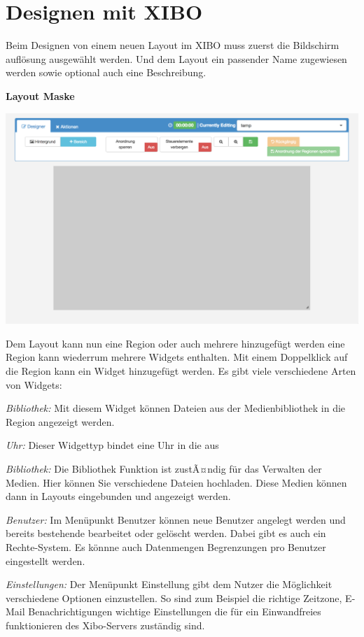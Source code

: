 \section{Designen mit XIBO}\label{sec:designexibo}
Beim Designen von einem neuen Layout im XIBO muss zuerst die Bildschirm auflösung ausgewählt werden. Und dem Layout ein passender Name zugewiesen werden sowie optional auch eine Beschreibung. 

\textbf{Layout Maske}

\begin{calendar}
	\centering
\includegraphics[width=1\textwidth]{images/xibo-basics-designer}
	\label{Calendar}
\end{calendar}	

Dem Layout kann nun eine Region oder auch mehrere  hinzugefügt werden eine Region kann wiederrum mehrere Widgets enthalten. Mit einem Doppelklick auf die Region kann ein Widget hinzugefügt werden. Es gibt viele verschiedene Arten von Widgets:

\begin{widgettypes}
	\item {\em Bibliothek:} Mit diesem Widget können Dateien aus der Medienbibliothek in die Region angezeigt werden. 

	
	\item {\em Uhr:} 
	Dieser Widgettyp bindet eine Uhr in die aus
	
	\item {\em Bibliothek:} 
	Die Bibliothek Funktion ist zustÃ¤ndig für das Verwalten der Medien. Hier können Sie verschiedene Dateien hochladen.  Diese Medien können dann in Layouts eingebunden und angezeigt werden.
	
	\item {\em Benutzer:} 
	Im Menüpunkt Benutzer können neue Benutzer angelegt werden und bereits bestehende bearbeitet oder gelöscht werden. Dabei gibt es auch ein Rechte-System. Es könnne auch Datenmengen Begrenzungen pro Benutzer eingestellt werden.
	
	\item {\em Einstellungen:} 
	Der Menüpunkt Einstellung gibt dem Nutzer die Möglichkeit verschiedene Optionen einzustellen. So sind zum Beispiel die richtige Zeitzone, E-Mail Benachrichtigungen wichtige Einstellungen die für ein Einwandfreies funktionieren des Xibo-Servers zuständig sind.
\end{widgettypes}

